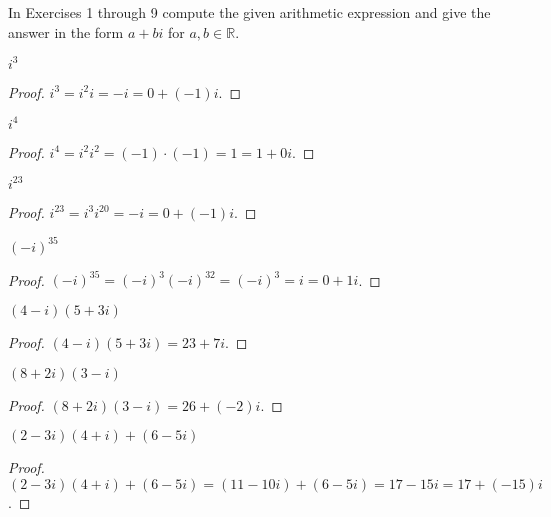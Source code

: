 In Exercises 1 through 9 compute the given arithmetic expression and give the answer in the form $a + bi$ for $a, b\in \mathbb{R}$.

\begin{exercise}
    $i^{3}$
\end{exercise}

\begin{proof}
    $i^{3} = {i}^{2}i = -i = 0 + (-1)i$.
\end{proof}

\begin{exercise}
    $i^{4}$
\end{exercise}

\begin{proof}
    $i^{4} = {i}^{2}{i}^{2} = (-1)\cdot (-1) = 1 = 1 + 0i$.
\end{proof}

\begin{exercise}
    $i^{23}$
\end{exercise}

\begin{proof}
    $i^{23} = {i}^{3}{i}^{20} = -i = 0 + (-1)i$.
\end{proof}

\begin{exercise}
    ${(-i)}^{35}$
\end{exercise}

\begin{proof}
    ${(-i)}^{35} = {(-i)}^{3}{(-i)}^{32} = {(-i)}^{3} = i = 0 + 1i$.
\end{proof}

\begin{exercise}
    $(4 - i)(5 + 3i)$
\end{exercise}

\begin{proof}
    $(4 - i)(5 + 3i) = 23 + 7i$.
\end{proof}

\begin{exercise}
    $(8 + 2i)(3 - i)$
\end{exercise}

\begin{proof}
    $(8 + 2i)(3 - i) = 26 + (-2)i$.
\end{proof}

\begin{exercise}
    $(2 - 3i)(4 + i) + (6 - 5i)$
\end{exercise}

\begin{proof}
    $(2 - 3i)(4 + i) + (6 - 5i) = (11 - 10i) + (6 - 5i) = 17 - 15i = 17 + (-15)i$.
\end{proof}

